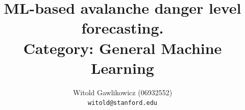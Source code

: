 \documentclass{article}
\title{ML-based avalanche danger level forecasting. \\ Category: General Machine Learning}
\author{
  Witold Gawlikowicz (06932552) \\
  \texttt{witold@stanford.edu}
}
\begin{document}
\maketitle

\graphicspath{{assets/figures/}}




	
	
\end{document}
